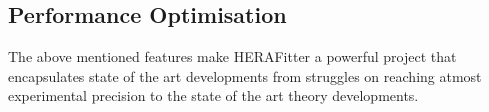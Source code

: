 \subsection{Performance Optimisation}

The above mentioned features make HERAFitter a powerful project that encapsulates state of the art developments from struggles on reaching atmost experimental precision to the state of the art theory developments. 



